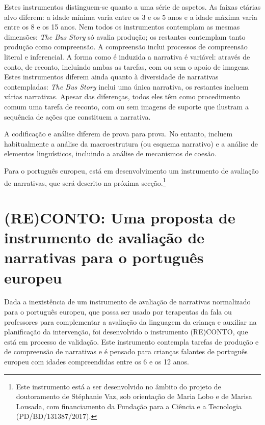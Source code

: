 \documentclass[output=paper,colorlinks,citecolor=brown,booklanguage=portuguese]{langscibook}
\begin{document}
Estes instrumentos distinguem-se quanto a uma série de aspetos. As faixas etárias alvo diferem: a idade mínima varia entre os 3 e os 5 anos e a idade máxima varia entre os 8 e os 15 anos. Nem todos os instrumentos contemplam as mesmas dimensões: \emph{The Bus Story} só avalia produção; os restantes contemplam tanto produção como compreensão. A compreensão inclui processos de compreensão literal e inferencial. A forma como é induzida a narrativa é variável: através de conto, de reconto, incluindo ambas as tarefas, com ou sem o apoio de imagens. Estes instrumentos diferem ainda quanto à diversidade de narrativas contempladas: \emph{The Bus Story} inclui uma única narrativa, os restantes incluem várias narrativas. Apesar das diferenças, todos eles têm como procedimento comum uma tarefa de reconto, com ou sem imagens de suporte que ilustram a sequência de ações que constituem a narrativa.

A codificação e análise diferem de prova para prova. No entanto, incluem habitualmente a análise da macroestrutura (ou esquema narrativo) e a análise de elementos linguísticos, incluindo a análise de mecanismos de coesão. 

\largerpage
Para o português europeu, está em desenvolvimento um instrumento de avaliação de narrativas, que será descrito na próxima secção.\footnote{Este instrumento está a ser desenvolvido no âmbito do projeto de doutoramento de Stéphanie Vaz, sob orientação de Maria Lobo e de Marisa Lousada, com financiamento da Fundação para a Ciência e a Tecnologia (PD/BD/131387/2017).}\clearpage


\section{(RE)CONTO: Uma proposta de instrumento de avaliação de narrativas para o português europeu}\label{sec:quatrocap16} Dada a inexistência de um instrumento de avaliação de narrativas normalizado para o português europeu, que possa ser usado por terapeutas da fala ou professores para complementar a avaliação da linguagem da criança e auxiliar na planificação da intervenção, foi desenvolvido o instrumento (RE)CONTO, que está em processo de validação. Este instrumento contempla tarefas de produção e de compreensão de narrativas e é pensado para crianças falantes de português europeu com idades compreendidas entre os 6 e os 12 anos.
\end{document}
